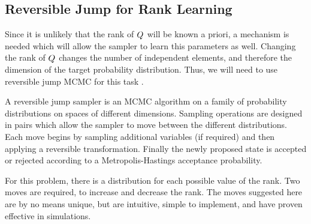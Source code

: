 \documentclass[journal,10pt]{IEEEtran}
\begin{document}
\subsection{Reversible Jump for Rank Learning}

Since it is unlikely that the rank of $Q_{}$ will be known a priori, a mechanism is needed which will allow the sampler to learn this parameters as well. Changing the rank of $Q_{}$ changes the number of independent elements, and therefore the dimension of the target probability distribution. Thus, we will need to use reversible jump MCMC for this task \cite{Green1995,Green2009}.

A reversible jump sampler is an MCMC algorithm on a family of probability distributions on spaces of different dimensions. Sampling operations are designed in pairs which allow the sampler to move between the different distributions. Each move begins by sampling additional variables (if required) and then applying a reversible transformation. Finally the newly proposed state is accepted or rejected according to a Metropolis-Hastings acceptance probability.

For this problem, there is a distribution for each possible value of the rank. Two moves are required, to increase and decrease the rank. The moves suggested here are by no means unique, but are intuitive, simple to implement, and have proven effective in simulations.
\end{document}

